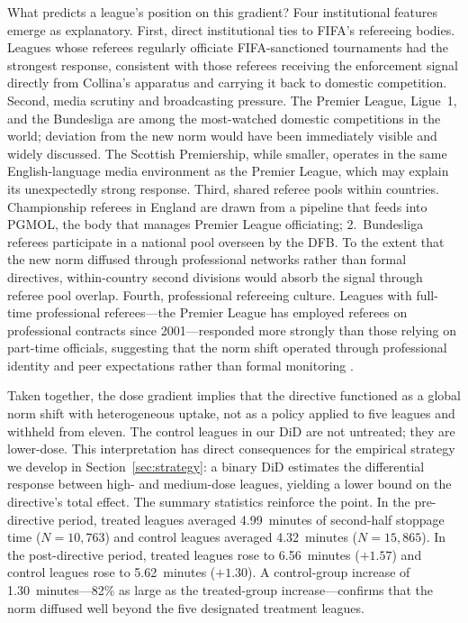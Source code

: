 What predicts a league's position on this gradient? Four institutional
features emerge as explanatory. First, direct institutional ties to
FIFA's refereeing bodies. Leagues whose referees regularly officiate
FIFA-sanctioned tournaments had the strongest response, consistent with
those referees receiving the enforcement signal directly from Collina's
apparatus and carrying it back to domestic competition. Second, media
scrutiny and broadcasting pressure. The Premier League, Ligue~1, and the
Bundesliga are among the most-watched domestic competitions in the world;
deviation from the new norm would have been immediately visible and
widely discussed. The Scottish Premiership, while smaller, operates in
the same English-language media environment as the Premier League, which
may explain its unexpectedly strong response. Third, shared referee pools
within countries. Championship referees in England are drawn from a
pipeline that feeds into PGMOL, the body that manages Premier League
officiating; 2.~Bundesliga referees participate in a national pool
overseen by the DFB. To the extent that the new norm diffused through
professional networks rather than formal directives, within-country
second divisions would absorb the signal through referee pool overlap.
Fourth, professional refereeing culture. Leagues with full-time
professional referees---the Premier League has employed referees on
professional contracts since 2001---responded more strongly than those
relying on part-time officials, suggesting that the norm shift operated
through professional identity and peer expectations rather than formal
monitoring \citep[cf.][on referee responsiveness to institutional
incentives]{garicano2005favoritism}.

Taken together, the dose gradient implies that the directive functioned
as a global norm shift with heterogeneous uptake, not as a policy
applied to five leagues and withheld from eleven. The control leagues in
our DiD are not untreated; they are lower-dose. This interpretation has
direct consequences for the empirical strategy we develop in
Section~\ref{sec:strategy}: a binary DiD estimates the differential
response between high- and medium-dose leagues, yielding a lower bound
on the directive's total effect. The summary statistics reinforce the
point. In the pre-directive period, treated leagues averaged 4.99~minutes
of second-half stoppage time ($N = 10{,}763$) and control leagues
averaged 4.32~minutes ($N = 15{,}865$). In the post-directive period,
treated leagues rose to 6.56~minutes ($+1.57$) and control leagues rose
to 5.62~minutes ($+1.30$). A control-group increase of 1.30~minutes---82\%
as large as the treated-group increase---confirms that the norm diffused
well beyond the five designated treatment leagues.


